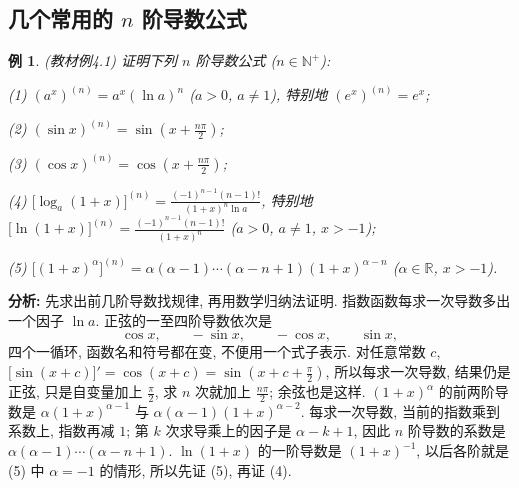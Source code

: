 \documentclass[UTF8,openany]{ctexbook}
\theoremstyle{chinesetextbook}
\newtheorem{example}{例}[section]
\begin{document}
\subsection{\texorpdfstring{几个常用的 $n$ 阶导数公式}{几个常用的 n 阶导数公式}}
\begin{example}\label{ex:c2-4-1}
\textnormal{(教材例4.1)} 证明下列 $n$ 阶导数公式 ($n\in\mathbb N^+$):

(1) $(a^x)^{(n)}=a^x(\ln a)^n$ ($a>0$, $a\ne1$), 特别地 $(e^x)^{(n)}=e^x$;

(2) $\displaystyle(\sin x)^{(n)}=\sin\left(x+\frac{n\pi}2\right)$;

(3) $\displaystyle(\cos x)^{(n)}=\cos\left(x+\frac{n\pi}2\right)$;

(4) $\displaystyle\bigl[\log_a(1+x)\bigr]^{(n)}=\frac{(-1)^{n-1}(n-1)!}{(1+x)^n\ln a}$, 特别地 $\displaystyle\bigl[\ln(1+x)\bigr]^{(n)}=\frac{(-1)^{n-1}(n-1)!}{(1+x)^n}$ ($a>0$, $a\ne1$, $x>-1$);

(5) $\bigl[(1+x)^\alpha\bigr]^{(n)}=\alpha(\alpha-1)\cdots(\alpha-n+1)(1+x)^{\alpha-n}$ ($\alpha\in\mathbb R$, $x>-1$).
\end{example}
\par\indent\textbf{分析:} 先求出前几阶导数找规律, 再用数学归纳法证明. 指数函数每求一次导数多出一个因子 $\ln a$. 正弦的一至四阶导数依次是
\[
\cos x,\qquad-\sin x,\qquad-\cos x,\qquad\sin x,
\]
四个一循环, 函数名和符号都在变, 不便用一个式子表示. 对任意常数 $c$, $\displaystyle\bigl[\sin(x+c)\bigr]'=\cos(x+c)=\sin\left(x+c+\frac\pi2\right)$, 所以每求一次导数, 结果仍是正弦, 只是自变量加上 $\displaystyle\frac\pi2$, 求 $n$ 次就加上 $\displaystyle\frac{n\pi}2$; 余弦也是这样. $(1+x)^\alpha$ 的前两阶导数是 $\alpha(1+x)^{\alpha-1}$ 与 $\alpha(\alpha-1)(1+x)^{\alpha-2}$. 每求一次导数, 当前的指数乘到系数上, 指数再减 $1$; 第 $k$ 次求导乘上的因子是 $\alpha-k+1$, 因此 $n$ 阶导数的系数是 $\alpha(\alpha-1)\cdots(\alpha-n+1)$. $\ln(1+x)$ 的一阶导数是 $(1+x)^{-1}$, 以后各阶就是 (5) 中 $\alpha=-1$ 的情形, 所以先证 (5), 再证 (4).
\end{document}

